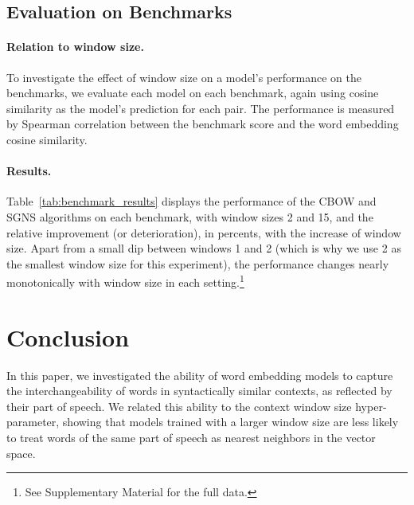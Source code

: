 \documentclass[11pt,a4paper]{article}
\begin{document}
    \subsection{Evaluation on Benchmarks}\label{sec:eval_exp}
    
    \paragraph{Relation to window size.}
    
    To investigate the effect of window size on a model's performance on the benchmarks,
    we evaluate each model on each benchmark, again using cosine similarity
    as the model's prediction for each pair.
    The performance is measured by Spearman correlation between the benchmark score
    and the word embedding cosine similarity.
    
    \paragraph{Results.}
    
    Table~\ref{tab:benchmark_results} displays the performance of the CBOW and SGNS
    algorithms on each benchmark, with window sizes 2 and 15,
    and the relative improvement (or deterioration),
    in percents, with the increase of window size.
    Apart from a small dip between windows 1 and 2
    (which is why we use 2 as the smallest window size for this experiment),
    the performance changes nearly monotonically with window size in each
    setting.\footnote{See Supplementary Material for the full data.}
    
    


\section{Conclusion}\label{sec:conclusion}

    In this paper, we investigated the ability of word embedding models
    to capture the interchangeability of words in syntactically similar contexts,
    as reflected by their part of speech.
    We related this ability to the context window size hyper-parameter,
    showing that models trained with a larger window size
    are less likely to treat words of the same part of speech as nearest neighbors
    in the vector space.
\end{document}
